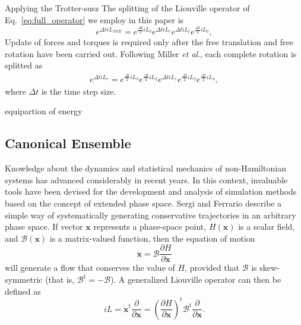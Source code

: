 \documentclass[aip,jcp,reprint,amsmath,amssymb]{revtex4-1}
\newcommand{\vt}[1]{\boldsymbol{\mathbf{#1}}}           %
\newcommand{\tr}[1]{#1^\text{t}}                        %
\newcommand{\diff}[2]{\dfrac{\partial #1}{\partial #2}} %
\begin{document}
Applying the Trotter-susz The splitting of the Liouville operator of Eq.~\eqref{eq:full_operator} we employ in this paper is
\begin{equation}
\label{eq:trotter_splitting_NVE}
e^{\Delta t i\!L_{NVE}} = e^{\frac{\Delta t}{2} i\!L_b} e^{\Delta t i\!L_r} e^{\Delta t i\!L_t} e^{\frac{\Delta t}{2} i\!L_b},
\end{equation}
Update of forces and torques is required only after the free translation and free rotation have been carried out. Following Miller \textit{et al}.,\cite{Miller2002} each complete rotation is splitted as
\begin{align*}
\label{eq:splitting_rot}
e^{\Delta t i\!L_r} =  e^{\frac{\Delta t}{2} i\!L_3} e^{\frac{\Delta t}{2} i\!L_2} e^{\Delta t i\!L_1} e^{\frac{\Delta t}{2} i\!L_2} e^{\frac{\Delta t}{2} i\!L_3},
\end{align*}
where ${\Delta t}$ is the time step size.

equipartion of energy

\subsection{Canonical Ensemble}
\label{sec:canonical}

Knowledge about the dynamics and statistical mechanics of non-Hamiltonian systems has advanced considerably in recent years.\cite{Tuckerman_1999, Tuckerman2001, Sergi2001, Sergi2003, Ezra2004, Sergi2004, Ezra2006, Sergi2010b} In this context, invaluable tools have been devised for the development and analysis of simulation methods based on the concept of extended phase space. Sergi and Ferrario\cite{Sergi2001} describe a simple way of systematically generating conservative trajectories in an arbitrary phase space. If vector $\vt x$ represents a phase-space point, $H(\vt x)$ is a scalar field, and $\boldsymbol{\mathcal B}(\vt x)$ is a matrix-valued function, then the equation of motion
\begin{equation} \label{eq:eq_of_motion}
\dot{\vt x} = \boldsymbol{\mathcal B}\diff{H}{\vt x}
\end{equation}
will generate a flow that conserves the value of $H$, provided that $\boldsymbol{\mathcal B}$ is skew-symmetric (that is, $\tr{ \boldsymbol{ \mathcal B }} = -\boldsymbol{ \mathcal B }$). A generalized Liouville operator can then be defined as\cite{Sergi2004}
\[
i\!L = \tr{\dot{\vt x}}\diff{}{\vt x} = \tr{\left(\diff{H}{\vt x}\right)} \tr{\boldsymbol{\mathcal B}} \diff{}{\vt x}.
\]
\end{document}
